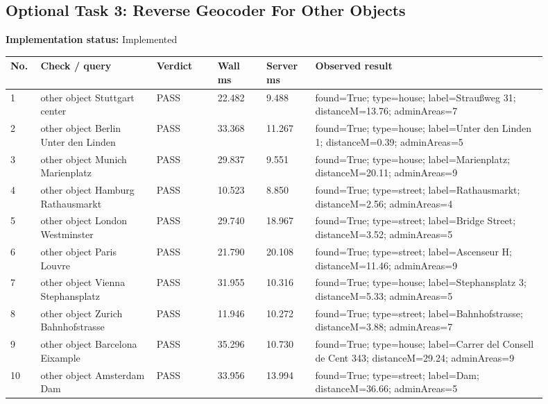 \documentclass[10pt,a4paper]{article}
\begin{document}
\subsection{Optional Task 3: Reverse Geocoder For Other Objects}
\textbf{Implementation status:} Implemented\\
\scriptsize
\begin{longtable}{|P{0.045\linewidth}|P{0.19\linewidth}|P{0.105\linewidth}|P{0.085\linewidth}|P{0.085\linewidth}|P{0.385\linewidth}|}
\hline
\textbf{No.} & \textbf{Check / query} & \textbf{Verdict} & \textbf{Wall ms} & \textbf{Server ms} & \textbf{Observed result}\\ \hline
{} 1 & other object Stuttgart center & PASS & 22.482 & 9.488 & found=True; type=house; label=Straußweg 31; distanceM=13.76; adminAreas=7\\ \hline
{} 2 & other object Berlin Unter den Linden & PASS & 33.368 & 11.267 & found=True; type=house; label=Unter den Linden 1; distanceM=0.39; adminAreas=5\\ \hline
{} 3 & other object Munich Marienplatz & PASS & 29.837 & 9.551 & found=True; type=house; label=Marienplatz; distanceM=20.11; adminAreas=9\\ \hline
{} 4 & other object Hamburg Rathausmarkt & PASS & 10.523 & 8.850 & found=True; type=street; label=Rathausmarkt; distanceM=2.56; adminAreas=4\\ \hline
{} 5 & other object London Westminster & PASS & 29.740 & 18.967 & found=True; type=street; label=Bridge Street; distanceM=3.52; adminAreas=5\\ \hline
{} 6 & other object Paris Louvre & PASS & 21.790 & 20.108 & found=True; type=street; label=Ascenseur H; distanceM=11.46; adminAreas=9\\ \hline
{} 7 & other object Vienna Stephansplatz & PASS & 31.955 & 10.316 & found=True; type=house; label=Stephansplatz 3; distanceM=5.33; adminAreas=5\\ \hline
{} 8 & other object Zurich Bahnhofstrasse & PASS & 11.946 & 10.272 & found=True; type=street; label=Bahnhofstrasse; distanceM=3.88; adminAreas=7\\ \hline
{} 9 & other object Barcelona Eixample & PASS & 35.296 & 10.730 & found=True; type=house; label=Carrer del Consell de Cent 343; distanceM=29.24; adminAreas=9\\ \hline
{} 10 & other object Amsterdam Dam & PASS & 33.956 & 13.994 & found=True; type=street; label=Dam; distanceM=36.66; adminAreas=5\\ \hline
\end{longtable}
\normalsize
\end{document}

